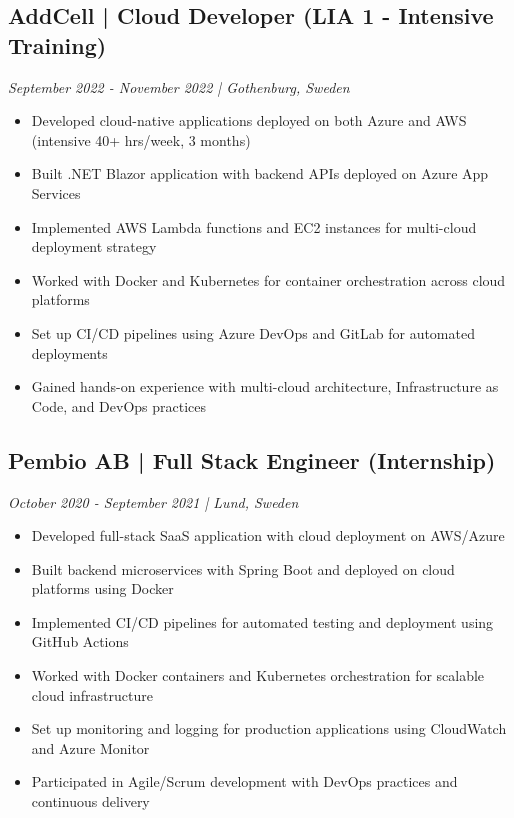 \documentclass[11pt,a4paper]{article}
\begin{document}
\subsection*{AddCell | Cloud Developer (LIA 1 - Intensive Training)}
\textit{September 2022 - November 2022 | Gothenburg, Sweden}
\begin{itemize}[noitemsep]
\item Developed cloud-native applications deployed on both Azure and AWS (intensive 40+ hrs/week, 3 months)
\item Built .NET Blazor application with backend APIs deployed on Azure App Services
\item Implemented AWS Lambda functions and EC2 instances for multi-cloud deployment strategy
\item Worked with Docker and Kubernetes for container orchestration across cloud platforms
\item Set up CI/CD pipelines using Azure DevOps and GitLab for automated deployments
\item Gained hands-on experience with multi-cloud architecture, Infrastructure as Code, and DevOps practices
\end{itemize}

\subsection*{Pembio AB | Full Stack Engineer (Internship)}
\textit{October 2020 - September 2021 | Lund, Sweden}
\begin{itemize}[noitemsep]
\item Developed full-stack SaaS application with cloud deployment on AWS/Azure
\item Built backend microservices with Spring Boot and deployed on cloud platforms using Docker
\item Implemented CI/CD pipelines for automated testing and deployment using GitHub Actions
\item Worked with Docker containers and Kubernetes orchestration for scalable cloud infrastructure
\item Set up monitoring and logging for production applications using CloudWatch and Azure Monitor
\item Participated in Agile/Scrum development with DevOps practices and continuous delivery
\end{itemize}
\end{document}
